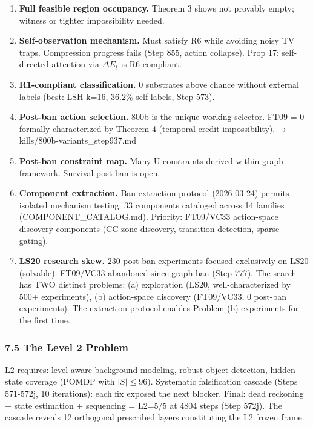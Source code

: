\documentclass[
  11pt,
]{article}
\providecommand{\tightlist}{%
  \setlength{\itemsep}{0pt}\setlength{\parskip}{0pt}}
\begin{document}
\begin{enumerate}
\def\labelenumi{\arabic{enumi}.}
\setcounter{enumi}{14}
\tightlist
\item
  \textbf{Full feasible region occupancy.} Theorem 3 shows not provably
  empty; witness or tighter impossibility needed.
\item
  \textbf{Self-observation mechanism.} Must satisfy R6 while avoiding
  noisy TV traps. Compression progress fails (Step 855, action
  collapse). Prop 17: self-directed attention via \(\Delta E_t\) is
  R6-compliant.
\item
  \textbf{R1-compliant classification.} 0 substrates above chance
  without external labels (best: LSH k=16, 36.2\% self-labels, Step
  573).
\item
  \textbf{Post-ban action selection.} 800b is the unique working
  selector. FT09 = 0 formally characterized by Theorem 4 (temporal
  credit impossibility). → kills/800b-variants\_step937.md
\item
  \textbf{Post-ban constraint map.} Many U-constraints derived within
  graph framework. Survival post-ban is open.
\item
  \textbf{Component extraction.} Ban extraction protocol (2026-03-24)
  permits isolated mechanism testing. 33 components cataloged across 14
  families (COMPONENT\_CATALOG.md). Priority: FT09/VC33 action-space
  discovery components (CC zone discovery, transition detection, sparse
  gating).
\item
  \textbf{LS20 research skew.} 230 post-ban experiments focused
  exclusively on LS20 (solvable). FT09/VC33 abandoned since graph ban
  (Step 777). The search has TWO distinct problems: (a) exploration
  (LS20, well-characterized by 500+ experiments), (b) action-space
  discovery (FT09/VC33, 0 post-ban experiments). The extraction protocol
  enables Problem (b) experiments for the first time.
\end{enumerate}

\subsubsection{7.5 The Level 2 Problem}\label{the-level-2-problem}

L2 requires: level-aware background modeling, robust object detection,
hidden-state coverage (POMDP with \(|S| \leq 96\)). Systematic
falsification cascade (Steps 571-572j, 10 iterations): each fix exposed
the next blocker. Final: dead reckoning + state estimation + sequencing
= L2=5/5 at 4804 steps (Step 572j). The cascade reveals 12 orthogonal
prescribed layers constituting the L2 frozen frame.
\end{document}
